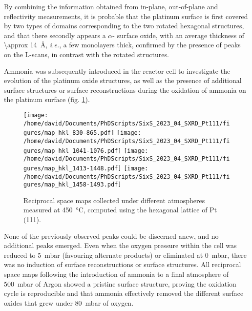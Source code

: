 By combining the information obtained from in-plane, out-of-plane and reflectivity measurements, it is probable that the platinum surface is first covered by two types of domains corresponding to the two rotated hexagonal structures, and that there secondly appears a $\alpha$- surface oxide, with an average thickness of \qty{\approx 14}{\angstrom}, \textit{i.e.}, a few monolayers thick, confirmed by the presence of peaks on the L-scans, in contrast with the rotated structures.


Ammonia was subsequently introduced in the reactor cell to investigate the evolution of the platinum oxide structures, as well as the presence of additional surface structures or surface reconstructions during the oxidation of ammonia on the platinum surface (fig. \ref{fig:MapsPt111B}).

\begin{figure}[!htb]
    \centering
    \texttt{[image: /home/david/Documents/PhDScripts/SixS\_2023\_04\_SXRD\_Pt111/figures/map\_hkl\_830-865.pdf]}
    \texttt{[image: /home/david/Documents/PhDScripts/SixS\_2023\_04\_SXRD\_Pt111/figures/map\_hkl\_1041-1076.pdf]}
    \texttt{[image: /home/david/Documents/PhDScripts/SixS\_2023\_04\_SXRD\_Pt111/figures/map\_hkl\_1413-1448.pdf]}
    \texttt{[image: /home/david/Documents/PhDScripts/SixS\_2023\_04\_SXRD\_Pt111/figures/map\_hkl\_1458-1493.pdf]}
    \caption{
        Reciprocal space maps collected under different atmospheres measured at \qty{450}{\degreeCelsius}, computed using the hexagonal lattice of Pt (111).
    }
    \label{fig:MapsPt111B}
\end{figure}

None of the previously observed peaks could be discerned anew, and no additional peaks emerged.
Even when the oxygen pressure within the cell was reduced to \qty{5}{\milli\bar} (favouring alternate products) or eliminated at \qty{0}{\milli\bar}, there was no induction of surface reconstructions or surface structures.
All reciprocal space maps following the introduction of ammonia to a final atmosphere of \qty{500}{\milli\bar} of Argon showed a pristine surface structure, proving the oxidation cycle is reproducible and that ammonia effectively removed the different surface oxides that grew under \qty{80}{\milli\bar} of oxygen.

